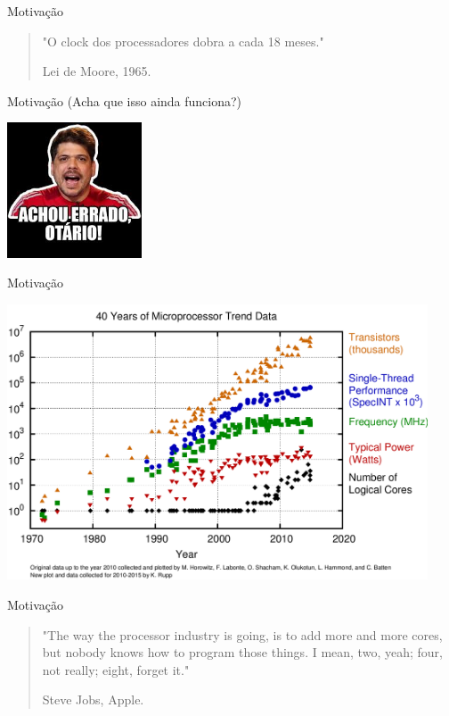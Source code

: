 \documentclass[aspectratio=169]{beamer}
\begin{document}
\begin{frame}{Motivação}
	\begin{quote}
		\hspace{0.5cm}"O clock dos processadores dobra a cada 18 meses."
		
		\hspace{8.2cm}Lei de Moore, 1965.
	\end{quote}
\end{frame}

\begin{frame}[noframenumbering]{Motivação (Acha que isso ainda funciona?)}
	\begin{center}
		\includegraphics[width=4.0cm]{imgs/choque_de_cultura_05.jpg}	
	\end{center}
\end{frame}

\begin{frame}{Motivação}
	\begin{center}
		\includegraphics[width=12.5cm]{imgs/cores-history.png}
	\end{center}
\end{frame}

\begin{frame}{Motivação}
	\begin{quote}
		"The way the processor industry is going, is to add more and more cores, but nobody knows how to program those things. I mean, two, yeah; four, not really; eight, forget it."
		
		\hspace{8.2cm}Steve Jobs, Apple.
	\end{quote}
\end{frame}
\end{document}
